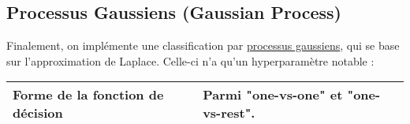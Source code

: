 \subsection{Processus Gaussiens (Gaussian Process)}

Finalement, on implémente une classification par \href{https://scikit-learn.org/stable/modules/generated/sklearn.gaussian_process.GaussianProcessClassifier.html}{processus gaussiens}, qui se base sur l'approximation de Laplace. Celle-ci n'a qu'un hyperparamètre notable :\\

\noindent
\begin{tabularx}{\textwidth}{|X|X|}
    \hline
     Forme de la fonction de décision  & Parmi "one-vs-one" et "one-vs-rest".\\\hline
\end{tabularx}